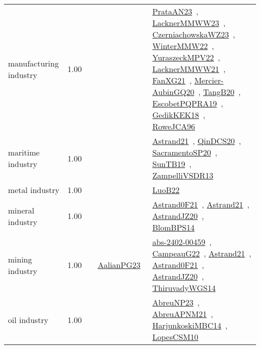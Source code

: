 {\begin{longtable}{p{3cm}r>{\raggedright\arraybackslash}p{6cm}>{\raggedright\arraybackslash}p{6cm}>{\raggedright\arraybackslash}p{8cm}}
\index{manufacturing industry}\index{Industries!manufacturing industry}manufacturing industry &  1.00 &  &  & \href{../works/PrataAN23.pdf}{PrataAN23}~\cite{PrataAN23}, \href{../works/LacknerMMWW23.pdf}{LacknerMMWW23}~\cite{LacknerMMWW23}, \href{../works/CzerniachowskaWZ23.pdf}{CzerniachowskaWZ23}~\cite{CzerniachowskaWZ23}, \href{../works/WinterMMW22.pdf}{WinterMMW22}~\cite{WinterMMW22}, \href{../works/YuraszeckMPV22.pdf}{YuraszeckMPV22}~\cite{YuraszeckMPV22}, \href{../works/LacknerMMWW21.pdf}{LacknerMMWW21}~\cite{LacknerMMWW21}, \href{../works/FanXG21.pdf}{FanXG21}~\cite{FanXG21}, \href{../works/Mercier-AubinGQ20.pdf}{Mercier-AubinGQ20}~\cite{Mercier-AubinGQ20}, \href{../works/TangB20.pdf}{TangB20}~\cite{TangB20}, \href{../works/EscobetPQPRA19.pdf}{EscobetPQPRA19}~\cite{EscobetPQPRA19}, \href{../works/GedikKEK18.pdf}{GedikKEK18}~\cite{GedikKEK18}, \href{../works/RoweJCA96.pdf}{RoweJCA96}~\cite{RoweJCA96}\\
\index{maritime industry}\index{Industries!maritime industry}maritime industry &  1.00 &  &  & \href{../works/Astrand21.pdf}{Astrand21}~\cite{Astrand21}, \href{../works/QinDCS20.pdf}{QinDCS20}~\cite{QinDCS20}, \href{../works/SacramentoSP20.pdf}{SacramentoSP20}~\cite{SacramentoSP20}, \href{../works/SunTB19.pdf}{SunTB19}~\cite{SunTB19}, \href{../works/ZampelliVSDR13.pdf}{ZampelliVSDR13}~\cite{ZampelliVSDR13}\\
\index{metal industry}\index{Industries!metal industry}metal industry &  1.00 &  &  & \href{../works/LuoB22.pdf}{LuoB22}~\cite{LuoB22}\\
\index{mineral industry}\index{Industries!mineral industry}mineral industry &  1.00 &  &  & \href{../works/Astrand0F21.pdf}{Astrand0F21}~\cite{Astrand0F21}, \href{../works/Astrand21.pdf}{Astrand21}~\cite{Astrand21}, \href{../works/AstrandJZ20.pdf}{AstrandJZ20}~\cite{AstrandJZ20}, \href{../works/BlomBPS14.pdf}{BlomBPS14}~\cite{BlomBPS14}\\
\index{mining industry}\index{Industries!mining industry}mining industry &  1.00 &  & \href{../works/AalianPG23.pdf}{AalianPG23}~\cite{AalianPG23} & \href{../works/abs-2402-00459.pdf}{abs-2402-00459}~\cite{abs-2402-00459}, \href{../works/CampeauG22.pdf}{CampeauG22}~\cite{CampeauG22}, \href{../works/Astrand21.pdf}{Astrand21}~\cite{Astrand21}, \href{../works/Astrand0F21.pdf}{Astrand0F21}~\cite{Astrand0F21}, \href{../works/AstrandJZ20.pdf}{AstrandJZ20}~\cite{AstrandJZ20}, \href{../works/ThiruvadyWGS14.pdf}{ThiruvadyWGS14}~\cite{ThiruvadyWGS14}\\
\index{oil industry}\index{Industries!oil industry}oil industry &  1.00 &  &  & \href{../works/AbreuNP23.pdf}{AbreuNP23}~\cite{AbreuNP23}, \href{../works/AbreuAPNM21.pdf}{AbreuAPNM21}~\cite{AbreuAPNM21}, \href{../works/HarjunkoskiMBC14.pdf}{HarjunkoskiMBC14}~\cite{HarjunkoskiMBC14}, \href{../works/LopesCSM10.pdf}{LopesCSM10}~\cite{LopesCSM10}\\

\end{longtable}}
